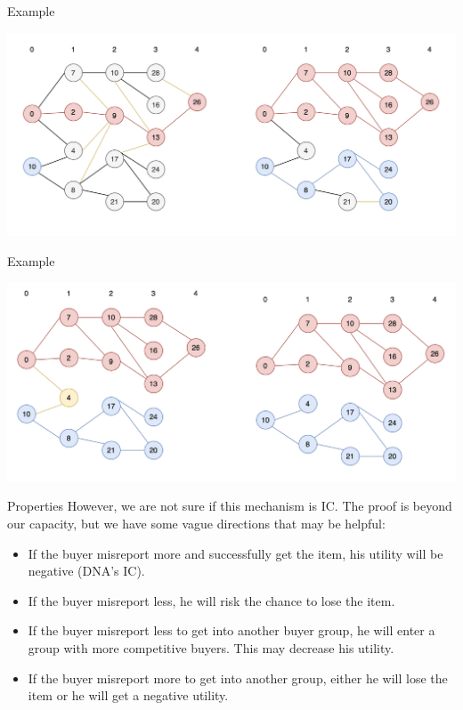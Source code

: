 \documentclass{beamer}
\begin{document}
\begin{frame}{Example}
	\begin{center}
		\includegraphics[width=\textwidth]{Graph02}
	\end{center}
\end{frame}
\begin{frame}{Example}
	\begin{center}
		\includegraphics[width=\textwidth]{Graph03}
	\end{center}
\end{frame}
\begin{frame}{Properties}
	However, we are not sure if this mechanism is IC. The proof is beyond our capacity, but we have some vague directions that may be helpful:
	\begin{itemize}
		\item If the buyer misreport more and successfully get the item, his utility will be negative (DNA's IC).
		\item If the buyer misreport less, he will risk the chance to lose the item.
		\item If the buyer misreport less to get into another buyer group, he will enter a group with more competitive buyers. This may decrease his utility.
		\item If the buyer misreport more to get into another group, either he will lose the item or he will get a negative utility.
	\end{itemize}
\end{frame}
\end{document}
